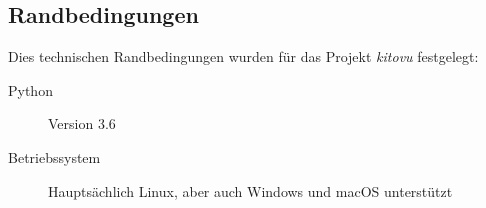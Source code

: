 \documentclass[a4paper]{article}
\begin{document}
\subsection{Randbedingungen}

Dies technischen Randbedingungen wurden für das Projekt \emph{kitovu} festgelegt:

\begin{description}
  \item[Python] Version 3.6
  \item[Betriebssystem] Hauptsächlich Linux, aber auch Windows und macOS unterstützt
\end{description}
\end{document}
